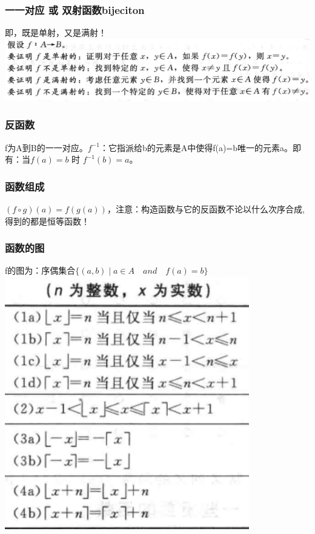 \documentclass{article}
\begin{document}
    \subsubsection{一一对应 或 双射函数bijeciton}
    即，既是单射，又是满射！\\
    \includegraphics[width=1\textwidth]{2019-07-15_11-00.png}
    \subsubsection{反函数}
    f为A到B的一一对应。$f^{-1}$：它指派给b的元素是A中使得f(a)=b唯一的元素a。即有：当$f(a)=b$ 时 $f^{-1}(b)=a$。
    \subsubsection{函数组成}
    $(f \circ g)(a)=f(g(a))$，注意：构造函数与它的反函数不论以什么次序合成,得到的都是恒等函数！
    \subsubsection{函数的图}
    f的图为：序偶集合$\{(a,b) \mid a\in A \quad and \quad f(a)=b\}$
    \\
    \includegraphics[width=0.8\textwidth]{2019-07-15_11-29.png}
\end{document}
